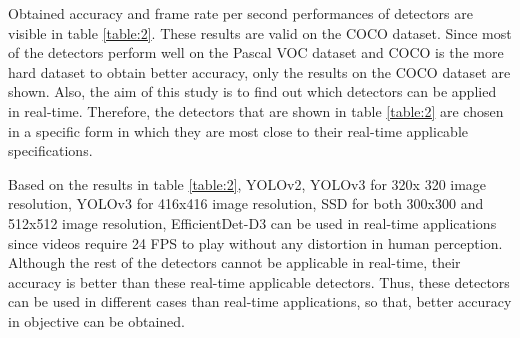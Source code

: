 \documentclass{article}
\begin{document}
\setlength{\parindent}{6ex}

\indent

Obtained accuracy and frame rate per second performances of detectors are visible 
in table \ref{table:2}. These results are valid on the COCO dataset. 
Since most of the detectors perform well on the Pascal VOC dataset and COCO is the more hard 
dataset to obtain better accuracy, only the results on the COCO dataset are shown. Also, 
the aim of this study is to find out which detectors can be applied in real-time. 
Therefore, the detectors that are shown in table \ref{table:2} 
are chosen in a specific form in which they are most close to their real-time 
applicable specifications. \par

Based on the results in table \ref{table:2}, YOLOv2, YOLOv3 for 320x
320 image resolution, YOLOv3 for 416x416 image resolution, SSD for both 300x300 and 
512x512 image resolution, EfficientDet-D3 can be used in real-time applications since 
videos require 24 FPS to play without any distortion in human perception. Although 
the rest of the detectors cannot be applicable in real-time, their accuracy is better 
than these real-time applicable detectors. Thus, these detectors can be used in 
different cases than real-time applications, so that, better accuracy in objective 
can be obtained.
\end{document}

